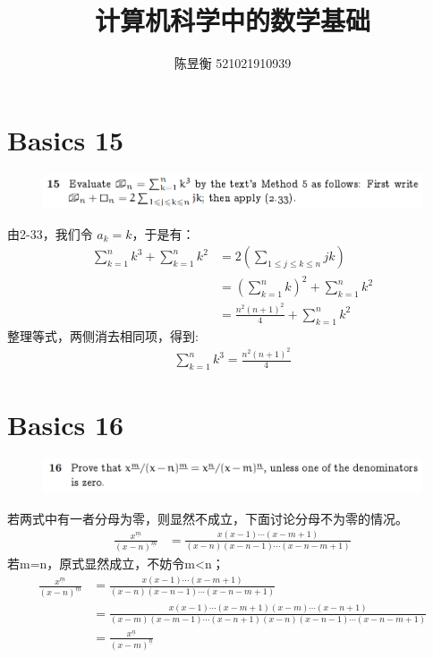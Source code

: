 \documentclass[]{article}
\title{计算机科学中的数学基础}
\author{陈昱衡 521021910939}
\date{}
\begin{document}
\maketitle



\section*{Basics 15}
\begin{figure}[H]
    \includegraphics[scale = 1]{Q1.png}
\end{figure}
由2-33，我们令 $a_{k} = k$，于是有：
\begin{align}
    \sum_{k=1}^{n} k^{3} + \sum_{k=1}^{n} k^{2} &= 2(\sum_{1 \le j \le k \le n}jk)\\
    &=(\sum_{k=1}^{n}k)^{2} + \sum_{k=1}^{n}k^2\\
    &=\frac{n^2(n+1)^2}{4} + \sum_{k=1}^{n}k^2
\end{align}
整理等式，两侧消去相同项，得到:
\begin{align}
    \sum_{k=1}^{n}k^3 = \frac{n^2(n+1)^2}{4}
\end{align}

\section*{Basics 16}
\begin{figure}[H]
    \includegraphics[scale = 1]{Q2.png}
\end{figure}
若两式中有一者分母为零，则显然不成立，下面讨论分母不为零的情况。
\begin{align}
    \frac{x^{\underline{m}}}{(x-n)^{\underline{m}}} &=
    \frac{x(x-1)\cdots(x-m+1)}{(x-n)(x-n-1)\cdots(x-n-m+1)}
\end{align}
若m=n，原式显然成立，不妨令m<n；
\begin{align}
    \frac{x^{\underline{m}}}{(x-n)^{\underline{m}}} &=
    \frac{x(x-1)\cdots(x-m+1)}{(x-n)(x-n-1)\cdots(x-n-m+1)}
    \\
    &=\frac{x(x-1)\cdots(x-m+1)(x-m)\cdots(x-n+1)}{(x-m)(x-m-1)\cdots(x-n+1)(x-n)(x-n-1)\cdots(x-n-m+1)}
    \\
    &=\frac{x^{\underline{n}}}{(x-m)^{\underline{n}}}
\end{align}
\end{document}
